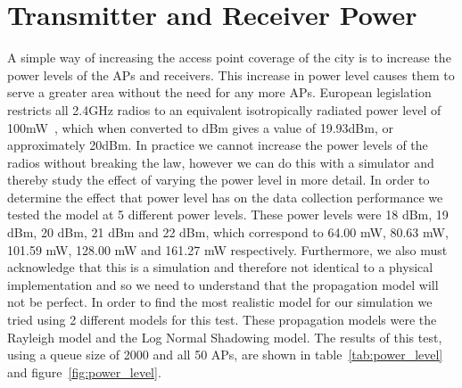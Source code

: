     \section{Transmitter and Receiver Power}\label{data_gathering_performance_transmitter_and_reciever_power}

        A simple way of increasing the access point coverage of the city is to increase the power levels of the APs and receivers. This increase in power level causes them to serve a greater area without the need for any more APs. European legislation restricts all 2.4GHz radios to an equivalent isotropically radiated power level of 100mW~\cite{rackley2011wireless}, which when converted to dBm gives a value of 19.93dBm, or approximately 20dBm. In practice we cannot increase the power levels of the radios without breaking the law, however we can do this with a simulator and thereby study the effect of varying the power level in more detail. In order to determine the effect that power level has on the data collection performance we tested the model at 5 different power levels. These power levels were 18 dBm, 19 dBm, 20 dBm, 21 dBm and 22 dBm, which correspond to 64.00 mW, 80.63 mW, 101.59 mW, 128.00 mW and 161.27 mW respectively. Furthermore, we also must acknowledge that this is a simulation and therefore not identical to a physical implementation and so we need to understand that the propagation model will not be perfect. In order to find the most realistic model for our simulation we tried using 2 different models for this test. These propagation models were the Rayleigh model and the Log Normal Shadowing model. The results of this test, using a queue size of 2000 and all 50 APs, are shown in table~\ref{tab:power_level} and figure~\ref{fig:power_level}. 


